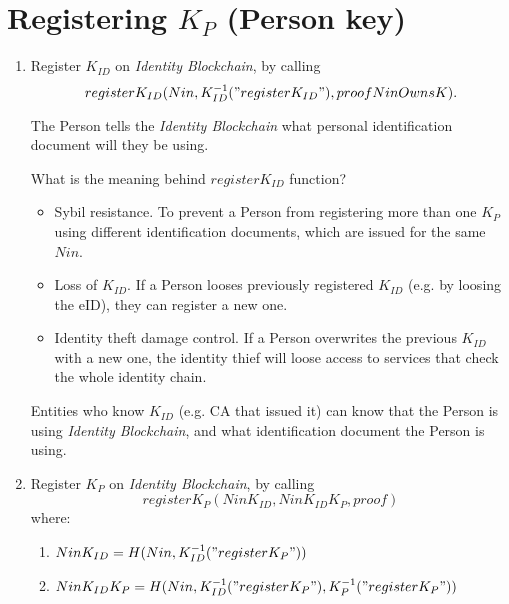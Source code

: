 \documentclass{article}
\newcommand{\khk}{K_{P}}
\newcommand{\kid}{K_{ID}}
\newcommand{\pbc}{\textit{Identity Blockchain}}
\begin{document}
\section{Registering $\khk$ (Person key)}
\begin{enumerate}
  \item Register $\kid$ on \pbc, by calling 
    $$register\kid(Nin, \kid^{-1}("register\kid"), proofNinOwnsK).$$
  
    The Person tells the \pbc{} what personal identification document will they be using.

    What is the meaning behind $register\kid$ function?
    \begin{itemize}
      \item Sybil resistance. To prevent a Person from registering more than one $\khk$ using different identification documents, which are issued for the same $Nin$.
      \item Loss of $\kid$. If a Person looses previously registered $\kid$ (e.g. by loosing the eID), they can register a new one.
      \item Identity theft damage control. If a Person overwrites the previous $\kid$ with a new one, the identity thief will loose access to services that check the whole identity chain.
    \end{itemize}

    Entities who know $\kid$ (e.g. CA that issued it) can know that the Person is using \pbc{}, and what identification document the Person is using.

  \item Register $\khk$ on \pbc, by calling 
    $$register\khk(Nin\kid, Nin\kid\khk, proof)$$
  where:
    \begin{enumerate}
      \item $Nin\kid=H(Nin,\kid^{-1}("register\khk"))$
      \item $Nin\kid\khk=H(Nin, \kid^{-1}("register\khk"), \khk^{-1}("register\khk"))$
    \end{enumerate}
\end{enumerate}

\newpage
\end{document}

